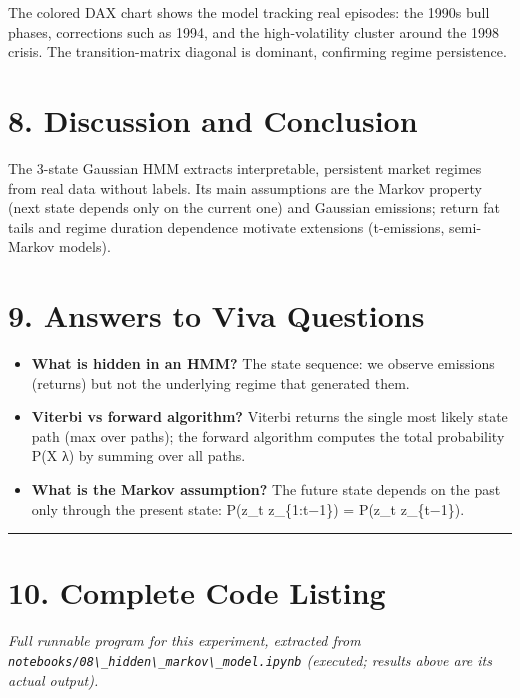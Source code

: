 The colored DAX chart shows the model tracking real episodes: the 1990s
bull phases, corrections such as 1994, and the high-volatility cluster
around the 1998 crisis. The transition-matrix diagonal is dominant,
confirming regime persistence.

\section{8. Discussion and Conclusion}\label{discussion-and-conclusion}

The 3-state Gaussian HMM extracts interpretable, persistent market
regimes from real data without labels. Its main assumptions are the
Markov property (next state depends only on the current one) and
Gaussian emissions; return fat tails and regime duration dependence
motivate extensions (t-emissions, semi-Markov models).

\section{9. Answers to Viva Questions}\label{answers-to-viva-questions}

\begin{itemize}
\tightlist
\item
  \textbf{What is hidden in an HMM?} The state sequence: we observe
  emissions (returns) but not the underlying regime that generated them.
\item
  \textbf{Viterbi vs forward algorithm?} Viterbi returns the single most
  likely state path (max over paths); the forward algorithm computes the
  total probability P(X \textbar{} λ) by summing over all paths.
\item
  \textbf{What is the Markov assumption?} The future state depends on
  the past only through the present state: P(z\_t \textbar{}
  z\_\{1:t−1\}) = P(z\_t \textbar{} z\_\{t−1\}).
\end{itemize}

\begin{center}\rule{0.5\linewidth}{0.5pt}\end{center}

\section{10. Complete Code Listing}\label{complete-code-listing}

\emph{Full runnable program for this experiment, extracted from
\passthrough{\lstinline!notebooks/08\_hidden\_markov\_model.ipynb!}
(executed; results above are its actual output).}

